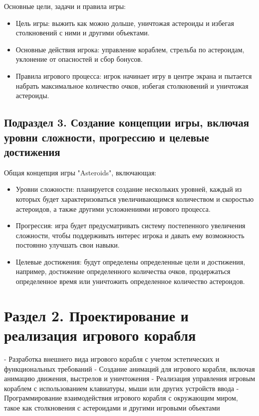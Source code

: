 Основные цели, задачи и правила игры:
\begin{itemize}
    \item Цель игры: выжить как можно дольше, уничтожая астероиды и избегая столкновений с ними и другими объектами.
    \item Основные действия игрока: управление кораблем, стрельба по астероидам, уклонение от опасностей и сбор бонусов.
    \item Правила игрового процесса: игрок начинает игру в центре экрана и пытается набрать максимальное количество очков, избегая столкновений и уничтожая астероиды.
\end{itemize}

\subsection{\label{subsec:ch02/sec01/sub03}Подраздел 3. Создание концепции игры, включая уровни сложности, прогрессию и целевые достижения}

Общая концепция игры "Asteroids", включающая:
\begin{itemize}
    \item Уровни сложности: планируется создание нескольких уровней, каждый из которых будет характеризоваться увеличивающимся количеством и скоростью астероидов, а также другими усложнениями игрового процесса.
    \item Прогрессия: игра будет предусматривать систему постепенного увеличения сложности, чтобы поддерживать интерес игрока и давать ему возможность постоянно улучшать свои навыки.
    \item Целевые достижения: будут определены определенные цели и достижения, например, достижение определенного количества очков, продержаться определенное время или уничтожить определенное количество астероидов.
\end{itemize}

\section{\label{sec:ch02/sec01}Раздел 2. Проектирование и реализация игрового корабля}

- Разработка внешнего вида игрового корабля с учетом эстетических и функциональных требований
- Создание анимаций для игрового корабля, включая анимацию движения, выстрелов и уничтожения
- Реализация управления игровым кораблем с использованием клавиатуры, мыши или других устройств ввода
- Программирование взаимодействия игрового корабля с окружающим миром, такое как столкновения с астероидами и другими игровыми объектами

